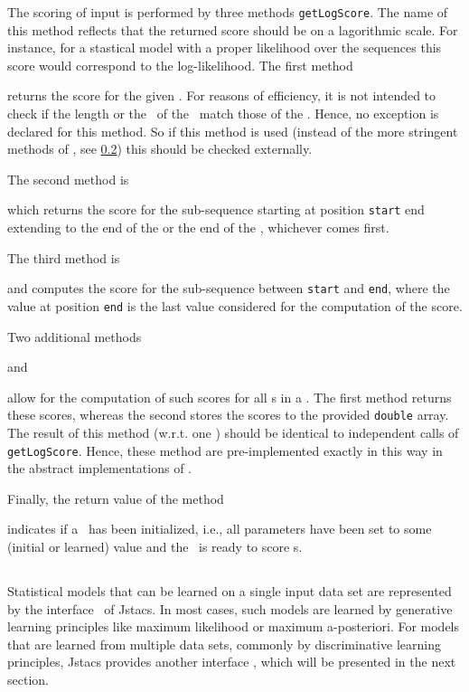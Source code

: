 The scoring of input \Sequence is performed by three methods \lstinline+getLogScore+. The name of this method reflects that the returned score should be on a lagorithmic scale. For instance, for a stastical model with a proper likelihood over the sequences this score would correspond to the log-likelihood.
The first method
\addtocounter{off}{10}
returns the score for the given \Sequence. For reasons of efficiency, it is not intended to check if the length or
the \AlphabetContainer~of the \Sequence~match those of the \SeqScore. Hence, no exception is declared for this method. So if
this method is used (instead of the more stringent methods of \StatMod, see \ref{}) this should be checked externally.

The second method is
\addtocounter{off}{13}
which returns the score for the sub-sequence starting at position \lstinline+start+ end extending to the end of the \Sequence or the end of the \SeqScore, whichever comes first.

The third method is
\addtocounter{off}{17}
and computes the score for the sub-sequence between \lstinline+start+ and \lstinline+end+, where the value at position \lstinline+end+ is the last value considered for the computation of the score.

Two additional methods
\addtocounter{off}{25}
and
\addtocounter{off}{26}
allow for the computation of such scores for all \Sequence s in a \DataSet. The first method returns these scores, whereas the second stores the scores to the provided \lstinline+double+ array. The result of this method (w.r.t. one \Sequence) should be identical
to independent calls of \lstinline+getLogScore+. Hence, these method are pre-implemented exactly in this way in the abstract implementations
of \SeqScore.

Finally, the return value of the method
\addtocounter{off}{9}
indicates if a \SeqScore~has been initialized, i.e., all parameters have been set to some (initial or learned) value and the \SeqScore~is
ready to score \Sequence s.

\subsection{\DiffSS}

\subsection{\TrainSM}

Statistical models that can be learned on a single input data set are represented by the interface \TrainSM~of Jstacs. In most cases, such models are learned by generative learning principles like maximum likelihood or maximum a-posteriori. For models that are learned from multiple data sets, commonly by discriminative learning principles, Jstacs provides another interface \DiffSM, which will be presented in the next section.

